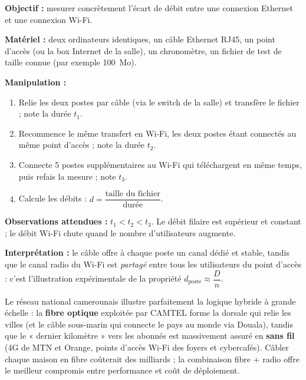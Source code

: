 \documentclass[11pt]{article}
\begin{document}
\begin{experience}
\textbf{Objectif :} mesurer concrètement l'écart de débit entre une connexion Ethernet et une connexion Wi-Fi.

\textbf{Matériel :} deux ordinateurs identiques, un câble Ethernet RJ45, un point d'accès (ou la box Internet de la salle), un chronomètre, un fichier de test de taille connue (par exemple \SI{100}{Mo}).

\textbf{Manipulation :}
\begin{enumerate}
\item Relie les deux postes par câble (via le switch de la salle) et transfère le fichier ; note la durée $t_1$.
\item Recommence le même transfert en Wi-Fi, les deux postes étant connectés au même point d'accès ; note la durée $t_2$.
\item Connecte 5 postes supplémentaires au Wi-Fi qui téléchargent en même temps, puis refais la mesure ; note $t_3$.
\item Calcule les débits : $d = \dfrac{\text{taille du fichier}}{\text{durée}}$.
\end{enumerate}

\textbf{Observations attendues :} $t_1 < t_2 < t_3$. Le débit filaire est supérieur et constant ; le débit Wi-Fi chute quand le nombre d'utilisateurs augmente.

\textbf{Interprétation :} le câble offre à chaque poste un canal dédié et stable, tandis que le canal radio du Wi-Fi est \emph{partagé} entre tous les utilisateurs du point d'accès : c'est l'illustration expérimentale de la propriété $d_{\text{poste}} \approx \dfrac{D}{n}$.
\end{experience}

\begin{savaistu}
Le réseau national camerounais illustre parfaitement la logique hybride à grande échelle : la \textbf{fibre optique} exploitée par CAMTEL forme la dorsale qui relie les villes (et le câble sous-marin qui connecte le pays au monde via Douala), tandis que le « dernier kilomètre » vers les abonnés est massivement assuré en \textbf{sans fil} (4G de MTN et Orange, points d'accès Wi-Fi des foyers et cybercafés). Câbler chaque maison en fibre coûterait des milliards ; la combinaison fibre + radio offre le meilleur compromis entre performance et coût de déploiement.
\end{savaistu}
\end{document}
